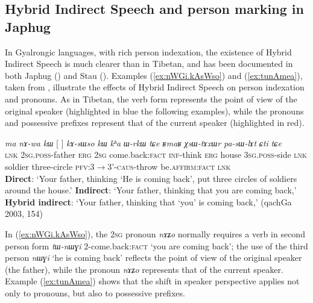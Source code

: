 \documentclass[oldfontcommands,oneside,a4paper,11pt]{article}
\newcommand{\ipa}[1]{{\phon\textit{#1}}} %
\newcommand{\refb}[1]{(\ref{#1})}
\newcommand{\bleu}[1]{{\color{blue}#1}}
\newcommand{\rouge}[1]{{\color{red}#1}}
\begin{document}
\subsection{Hybrid Indirect Speech and person marking in Japhug}
In Gyalrongic languages, with rich person indexation, the existence of Hybrid Indirect Speech is much clearer than in Tibetan, and has been documented in both Japhug (\citealt[241-244]{jacques16complementation}) and Stau (\citealt{jacques17stau}). Examples \refb{ex:nWGi.kAsWso} and \refb{ex:tunAmea}, taken from \citet[242-3]{jacques16complementation},  illustrate the effects of Hybrid Indirect Speech on person indexation and pronouns. As in Tibetan, the verb form represents the point of view of the original speaker (highlighted in blue the following examples), while the pronouns and possessive prefixes represent that of the current speaker (highlighted in red). 

\begin{exe}
\ex \label{ex:nWGi.kAsWso}
\gll 
\ipa{ma} \ipa{nɤ-wa}  	\ipa{kɯ}  	[\rouge{\ipa{nɤʑo}} 	\bleu{\ipa{nɯɣi}}]  	\ipa{kɤ-sɯso}  	\ipa{kɯ}  	\ipa{kʰa}  	\ipa{ɯ-rkɯ} \ipa{tɕe} 	\ipa{ʁmaʁ}  	\ipa{χsɯ-tɤxɯr}  	\ipa{pa-sɯ-lɤt}  	\ipa{ɕti}  	\ipa{tɕe}  \\
\textsc{lnk} \textsc{2sg.poss}-father \textsc{erg} \textsc{2sg} {come.back:\textsc{fact}}  \textsc{inf}-think \textsc{erg} house \textsc{3sg.poss}-side \textsc{lnk} soldier three-circle \textsc{pfv:3$\rightarrow$3'-caus}-throw be.\textsc{affirm}:\textsc{fact} \textsc{lnk}\\
\glt \textbf{Direct}: `Your father, thinking `\bleu{He is coming back}',   put three circles of soldiers around the house.' 
\glt  \textbf{Indirect}: `Your father, thinking that \rouge{you are coming back},'
\glt  \textbf{Hybrid indirect}: `Your father, thinking that `\rouge{you}' \bleu{is coming back},' (qachGa 2003, 154)
\end{exe}

In \refb{ex:nWGi.kAsWso}, the \textsc{2sg} pronoun \ipa{nɤʑo} normally requires a verb in second person form \ipa{tɯ-nɯɣi} 2-come.back:\textsc{fact} `you are coming back'; the use of the third person \ipa{nɯɣi} `he is coming back' reflects the point of view of the original speaker (the father), while the pronoun  \ipa{nɤʑo} represents that of the current speaker. Example \refb{ex:tunAmea} shows that the shift in speaker perspective applies not only to pronouns, but also to possessive prefixes.
\end{document}
